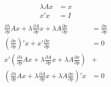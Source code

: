 \documentclass{article}
\begin{document}
\begin{align*}
  \lambda A x &= x\\
  x'x &= I\\
\end{align*}
\begin{align*}
  \frac{\partial \lambda}{\partial p}Ax + \lambda\frac{\partial
  A}{\partial p}x + \lambda A\frac{\partial x}{\partial p} &=
                                                            \frac{\partial x}{\partial p}\\
  \left(\frac{\partial x}{\partial p}\right)' x +
  x'\frac{\partial x}{\partial p} &= 0 \\
   x'\left( \frac{\partial \lambda}{\partial p}Ax + \lambda\frac{\partial
  A}{\partial p}x + \lambda A\frac{\partial x}{\partial p}\right) &+\\
  \left(\frac{\partial \lambda}{\partial p}Ax + \lambda\frac{\partial
  A}{\partial p}x + \lambda A\frac{\partial x}{\partial p}\right)'x &= 0
\end{align*}
\end{document}
